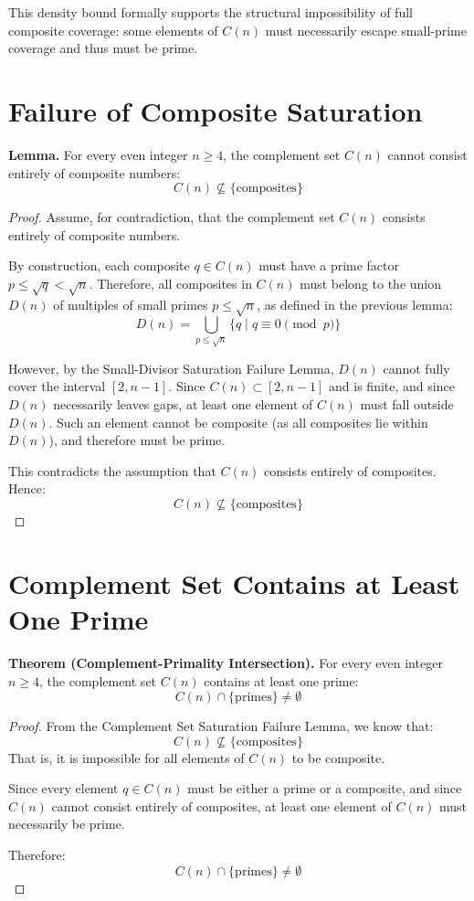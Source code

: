 \documentclass[11pt]{article}
\begin{document}
	This density bound formally supports the structural impossibility of full composite coverage: some elements of \( C(n) \) must necessarily escape small-prime coverage and thus must be prime.

	


	\section{Failure of Composite Saturation}
	
	\textbf{Lemma.}  
	For every even integer \( n \geq 4 \), the complement set \( C(n) \) cannot consist entirely of composite numbers:
	\[
	C(n) \not\subseteq \{\text{composites}\}
	\]
	
	\begin{proof}
		Assume, for contradiction, that the complement set \( C(n) \) consists entirely of composite numbers.
		
		By construction, each composite \( q \in C(n) \) must have a prime factor \( p \leq \sqrt{q} < \sqrt{n} \). Therefore, all composites in \( C(n) \) must belong to the union \( D(n) \) of multiples of small primes \( p \leq \sqrt{n} \), as defined in the previous lemma:
		\[
		D(n) = \bigcup_{p \leq \sqrt{n}} \{ q \mid q \equiv 0 \pmod{p} \}
		\]
		
		However, by the Small-Divisor Saturation Failure Lemma, \( D(n) \) cannot fully cover the interval \([2, n-1]\). Since \( C(n) \subset [2, n-1] \) and is finite, and since \( D(n) \) necessarily leaves gaps, at least one element of \( C(n) \) must fall outside \( D(n) \). Such an element cannot be composite (as all composites lie within \( D(n) \)), and therefore must be prime.
		
		This contradicts the assumption that \( C(n) \) consists entirely of composites. Hence:
		\[
		C(n) \not\subseteq \{\text{composites}\}
		\]
	\end{proof}

	
	
	\section{Complement Set Contains at Least One Prime}
	
	\textbf{Theorem (Complement-Primality Intersection).}  
	For every even integer \( n \geq 4 \), the complement set \( C(n) \) contains at least one prime:
	\[
	C(n) \cap \{\text{primes}\} \neq \emptyset
	\]
	
	\begin{proof}
		From the Complement Set Saturation Failure Lemma, we know that:
		\[
		C(n) \not\subseteq \{\text{composites}\}
		\]
		That is, it is impossible for all elements of \( C(n) \) to be composite.
		
		Since every element \( q \in C(n) \) must be either a prime or a composite, and since \( C(n) \) cannot consist entirely of composites, at least one element of \( C(n) \) must necessarily be prime.
		
		Therefore:
		\[
		C(n) \cap \{\text{primes}\} \neq \emptyset
		\]
	\end{proof}
\end{document}
